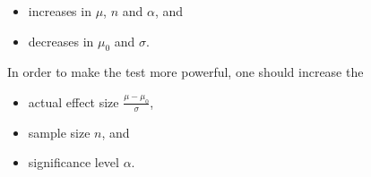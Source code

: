 \begin{solution}
\begin{enumerate}[label = (\alph*)]
    \begin{itemize}
        \item increases in $\mu$, $n$ and $\alpha$, and
        \item decreases in $\mu_0$ and $\sigma$.
    \end{itemize}

    In order to make the test more powerful, one should increase the

    \begin{itemize}
        \item actual effect size $\frac{\mu - \mu_0}{\sigma}$,
        \item sample size $n$, and
        \item significance level $\alpha$.
    \end{itemize}

\end{enumerate}

\end{solution}

